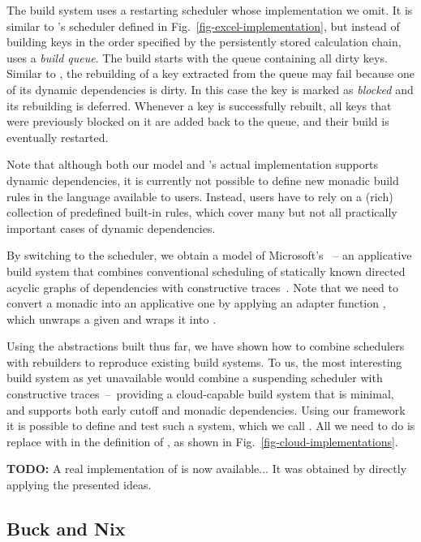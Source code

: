 The \Bazel build system uses a restarting scheduler whose implementation we
omit. It is similar to \Excel's  scheduler defined in
Fig.~\ref{fig-excel-implementation}, but instead of building keys in the order
specified by the persistently stored calculation chain, \Bazel uses a
\emph{build queue}. The build starts with the queue containing all dirty keys.
Similar to \Excel, the rebuilding of a key extracted from the queue may fail
because one of its dynamic dependencies is dirty. In this case the key is marked
as \emph{blocked} and its rebuilding is deferred. Whenever a key is successfully
rebuilt, all keys that were previously blocked on it are added back to the
queue, and their build is eventually restarted.

Note that although both our model and \Bazel's actual implementation supports
dynamic dependencies, it is currently not possible to define new monadic build
rules in the language available to users. Instead, users have to rely on a
(rich) collection of predefined built-in rules, which cover many but not all
practically important cases of dynamic dependencies.

By switching to the  scheduler, we obtain a model of
Microsoft's \CloudBuild~-- an applicative build system that combines
conventional scheduling of statically known directed acyclic graphs of
dependencies with constructive traces~\cite{esfahani2016cloudbuild}. Note that
we need to convert a monadic  into an applicative one by
applying an adapter function , which unwraps a given
 and wraps it into .

Using the abstractions built thus far, we have shown how to combine schedulers
with rebuilders to reproduce existing build systems. To us, the most interesting
build system as yet unavailable would combine a suspending scheduler with
constructive traces~--~providing a cloud-capable build system that is minimal,
and supports both early cutoff and monadic dependencies. Using our framework it
is possible to define and test such a system, which we call \Cloud \Shake. All
we need to do is replace  with  in the definition
of \Bazel, as shown in Fig.~\ref{fig-cloud-implementations}.

\textbf{TODO:} A real implementation of \Cloud \Shake is now available... It was
obtained by directly applying the presented ideas.

\subsection{Buck and Nix}

